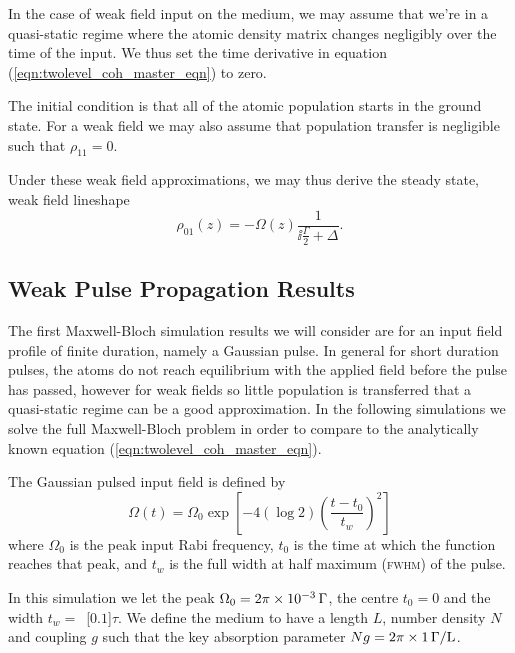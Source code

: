     In the case of weak field input on the medium, we may assume that we're in a
    quasi-static regime where the atomic density matrix changes negligibly over
    the time of the input. We thus set the time derivative in equation
    (\ref{eqn:twolevel_coh_master_eqn}) to zero.

    The initial condition is that all of the atomic population starts in the
    ground state. For a weak field we may also assume that population transfer
    is negligible such that $\rho_{11} = 0$.

    Under these weak field approximations, we may thus derive the steady state,
    weak field lineshape
    \begin{equation}\label{eqn:weak_lineshape}
      \rho_{01}(z) = -\Omega(z) \frac{1}{\ii \frac{\Gamma}{2} + \Delta}.
    \end{equation}

  \subsection{Weak Pulse Propagation Results}    

    The first Maxwell-Bloch simulation results we will consider are for an input
    field profile of finite duration, namely a Gaussian pulse. In general for
    short duration pulses, the atoms do not reach equilibrium with the applied
    field before the pulse has passed, however for weak fields so little
    population is transferred that a quasi-static regime can be a good
    approximation. In the following simulations we solve the full Maxwell-Bloch
    problem in order to compare to the analytically known equation
    (\ref{eqn:twolevel_coh_master_eqn}).

    The Gaussian pulsed input field is defined by
    \begin{equation}
      \Omega(t) = \Omega_{0} \exp \left[ -4 \left( \log 2 \right) \left( 
                    \frac{t - t_0}{t_w} \right)^2 \right]
      \label{eqn:gaussian}
    \end{equation}
    where $\Omega_{0}$ is the peak input Rabi frequency, $t_0$ is the time at
    which the function reaches that peak, and $t_w$ is the full width at half
    maximum (\textsc{fwhm}) of the pulse.

    In this simulation we let the peak $\Omega_0 =
    \unit[2\pi\times10^{-3}]{\Gamma}$, the centre $t_0 = 0$ and the width $t_w
    =$~\unit[$0.1$]{$\tau$}. We define the medium to have a length $L$, number
    density $N$ and coupling $g$ such that the key absorption parameter $Ng =
    \unit[2\pi\times1]{\Gamma /L}$.

